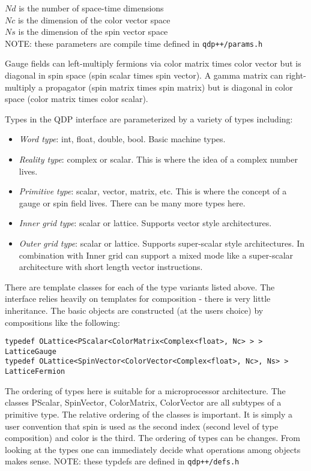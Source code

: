 \documentclass[12pt,letterpaper]{article}
\begin{document}
\noindent
$Nd$ is the number of space-time dimensions\\
\noindent
$Nc$ is the dimension of the color vector space\\
\noindent
$Ns$ is the dimension of the spin vector space\\
\noindent
NOTE: these parameters are compile time defined in  {\tt qdp++/params.h}

Gauge fields can left-multiply fermions via color matrix times color
vector but is diagonal in spin space (spin scalar times spin vector).
A gamma matrix can right-multiply a propagator (spin matrix times
spin matrix) but is diagonal in color space (color matrix times color
scalar).

Types in the QDP interface are parameterized by a variety of types including:
\begin{itemize}
\item {\em Word type}: 
  int, float, double, bool. Basic machine types.
\item {\em Reality type}: 
  complex or scalar. This is where the idea of a complex number
  lives.
\item {\em Primitive type}: 
  scalar, vector, matrix, etc. This is where the concept of a gauge or
  spin field lives. There can be many more types here.
\item {\em Inner grid type}: 
  scalar or lattice. Supports vector style architectures.
\item {\em Outer grid type}:
  scalar or lattice. Supports super-scalar style architectures. In
  combination with Inner grid can support a mixed mode like a
  super-scalar architecture with short length vector instructions.
\end{itemize}

There are template classes for each of the type variants listed
above. The interface relies heavily on templates for
composition - there is very little inheritance. The basic objects are
constructed (at the users choice) by compositions like the following:

\begin{verbatim}
typedef OLattice<PScalar<ColorMatrix<Complex<float>, Nc> > > LatticeGauge
typedef OLattice<SpinVector<ColorVector<Complex<float>, Nc>, Ns> > LatticeFermion
\end{verbatim}
%
The ordering of types here is suitable for a microprocessor
architecture.  The classes PScalar, SpinVector, ColorMatrix,
ColorVector are all subtypes of a primitive type. The relative
ordering of the classes is important. It is simply a user convention
that spin is used as the second index (second level of type
composition) and color is the third. The ordering of types can be
changes. From looking at the types one can immediately decide what
operations among objects makes sense.
NOTE: these typdefs are defined in  {\tt qdp++/defs.h}
\end{document}
